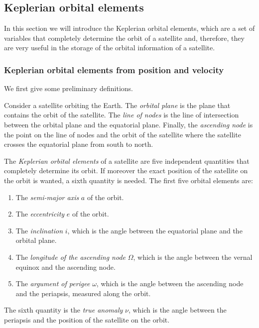 \documentclass[../main.tex]{subfiles}
\begin{document}
\subsection{Keplerian orbital elements}
In this section we will introduce the Keplerian orbital elements, which are a set of variables that completely determine the orbit of a satellite and, therefore, they are very useful in the storage of the orbital information of a satellite.
\subsubsection{Keplerian orbital elements from position and velocity}
We first give some preliminary definitions.
\begin{definition}
  Consider a satellite orbiting the Earth. The \emph{orbital plane} is the plane that contains the orbit of the satellite. The \emph{line of nodes} is the line of intersection between the orbital plane and the equatorial plane. Finally, the \emph{ascending node} is the point on the line of nodes and the orbit of the satellite where the satellite crosses the equatorial plane from south to north.
\end{definition}
\begin{definition}
  The \emph{Keplerian orbital elements} of a satellite are five independent quantities that completely determine its orbit. If moreover the exact position of the satellite on the orbit is wanted, a sixth quantity is needed. The first five orbital elements are:
  \begin{enumerate}
    \item The \emph{semi-major axis} $a$ of the orbit.
    \item The \emph{eccentricity} $e$ of the orbit.
    \item The \emph{inclination} $i$, which is the angle between the equatorial plane and the orbital plane.
    \item The \emph{longitude of the ascending node} $\Omega$, which is the angle between the vernal equinox and the ascending node.
    \item The \emph{argument of perigee} $\omega$, which is the angle between the ascending node and the periapsis, measured along the orbit.
  \end{enumerate}
  The sixth quantity is the \emph{true anomaly} $\nu$, which is the angle between the periapsis and the position of the satellite on the orbit.
\end{definition}
\end{document}
